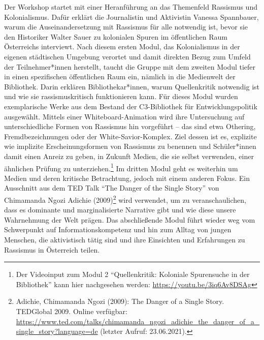 \documentclass[a4paper,
fontsize=11pt,
oneside,
numbers=noperiodatend,
parskip=half-,
bibliography=totoc,
final
]{scrartcl}
\begin{document}
Der Workshop startet mit einer Heranführung an das Themenfeld Rassismus
und Kolonialismus. Dafür erklärt die Journalistin und Aktivistin Vanessa
Spannbauer, warum die Auseinandersetzung mit Rassismus für alle
notwendig ist, bevor sie den Historiker Walter Sauer zu kolonialen
Spuren im öffentlichen Raum Österreichs interviewt. Nach diesem ersten
Modul, das Kolonialismus in der eigenen städtischen Umgebung verortet
und damit direkten Bezug zum Umfeld der Teilnehmer*innen herstellt,
taucht die Gruppe mit dem zweiten Modul tiefer in einen spezifischen
öffentlichen Raum ein, nämlich in die Medienwelt der Bibliothek. Darin
erklären Bibliothekar*innen, warum Quellenkritik notwendig ist und wie
sie rassismuskritisch funktionieren kann. Für dieses Modul wurden
exemplarische Werke aus dem Bestand der C3-Bibliothek für
Entwicklungspolitik ausgewählt. Mittels einer Whiteboard-Animation wird
ihre Untersuchung auf unterschiedliche Formen von Rassismus hin
vorgeführt -- das sind etwa Othering, Fremdbezeichnungen oder der
White-Savior-Komplex. Ziel dessen ist es, explizite wie implizite
Erscheinungsformen von Rassismus zu benennen und Schüler*innen damit
einen Anreiz zu geben, in Zukunft Medien, die sie selbst verwenden,
einer ähnlichen Prüfung zu unterziehen.\footnote{Der Videoinput zum
  Modul 2 \enquote{Quellenkritik: Koloniale Spurensuche in der
  Bibliothek} kann hier nachgesehen werden:
  \url{https://youtu.be/3iq6Av8DSAg}} Im dritten Modul geht es weiterhin
um Medien und deren kritische Betrachtung, jedoch mit einem anderen
Fokus. Ein Ausschnitt aus dem TED Talk \enquote{The Danger of the Single
Story} von Chimamanda Ngozi Adichie (2009)\footnote{Adichie, Chimamanda
  Ngozi (2009): The Danger of a Single Story. TEDGlobal 2009. Online
  verfügbar:
  \url{https://www.ted.com/talks/chimamanda_ngozi_adichie_the_danger_of_a_single_story?language=de}
  (letzter Aufruf: 23.06.2021).} wird verwendet, um zu veranschaulichen,
dass es dominante und marginalisierte Narrative gibt und wie diese
unsere Wahrnehmung der Welt prägen. Das abschließende Modul führt wieder
weg vom Schwerpunkt auf Informationskompetenz und hin zum Alltag von
jungen Menschen, die aktivistisch tätig sind und ihre Einsichten und
Erfahrungen zu Rassismus in Österreich teilen.
\end{document}
